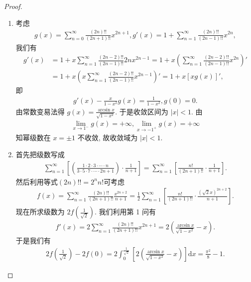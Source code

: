 \documentclass[../../main.tex]{subfiles}%
\begin{document}
\begin{proof}
\begin{enumerate}
\item 考虑
\begin{align*}
g(x) = \sum_{n=0}^{\infty} \frac{(2n)!!}{(2n + 1)!!} x^{2n + 1}, g'(x) = 1 + \sum_{n=1}^{\infty} \frac{(2n)!!}{(2n - 1)!!} x^{2n},
\end{align*}
我们有
\begin{align*}
g'(x) &= 1 + x \sum_{n=1}^{\infty} \frac{(2n - 2)!!}{(2n - 1)!!} 2n x^{2n - 1} = 1 + x \left( \sum_{n=1}^{\infty} \frac{(2n - 2)!!}{(2n - 1)!!} x^{2n} \right)' \\
&= 1 + x \left( x \sum_{n=1}^{\infty} \frac{(2n - 2)!!}{(2n - 1)!!} x^{2n - 1} \right)' = 1 + x [x g(x)]',
\end{align*}
即
\begin{align*}
g'(x) - \frac{x}{1 - x^2} g(x) = \frac{1}{1 - x^2}, g(0) = 0.
\end{align*}
由常数变易法得 $g(x) = \frac{\arcsin x}{\sqrt{1 - x^2}}$. 于是收敛区间为 $|x| < 1$. 由
\begin{align*}
\lim_{x \to 1^-} g(x) = +\infty, \lim_{x \to -1^+} g(x) = +\infty
\end{align*}
知幂级数在 $x = \pm 1$ 不收敛, 故收敛域为 $|x| < 1$.
\item 首先把级数写成
\begin{align*}
\sum_{n=1}^{\infty} \left[ \left( \frac{1 \cdot 2 \cdot 3 \cdot \cdots \cdot n}{3 \cdot 5 \cdot 7 \cdot \cdots \cdot 2n + 1} \right) \cdot \frac{1}{n + 1} \right] = \sum_{n=1}^{\infty} \left[ \frac{n!}{(2n + 1)!!} \cdot \frac{1}{n + 1} \right].
\end{align*}
然后利用等式$(2n)!!=2^nn!$可考虑
\begin{align*}
f(x) = \sum_{n=1}^{\infty} \frac{(2n)!!}{(2n + 1)!!} \frac{x^{2n + 2}}{n + 1} = \frac{1}{2} \sum_{n=1}^{\infty} \left[ \frac{n!}{(2n + 1)!!} \cdot \frac{(\sqrt{2}x)^{2n + 2}}{n + 1} \right].
\end{align*}
现在所求级数为 $2f\left( \frac{1}{\sqrt{2}} \right)$.
我们利用第 1 问有
\begin{align*}
f'(x) = 2 \sum_{n=1}^{\infty} \frac{(2n)!!}{(2n + 1)!!} x^{2n + 1} = 2 \left( \frac{\arcsin x}{\sqrt{1 - x^2}} - x \right).
\end{align*}
于是我们有
\begin{align*}
2f\left( \frac{1}{\sqrt{2}} \right) - 2f(0) = 2 \int_0^{\frac{1}{\sqrt{2}}} \left[ 2 \left( \frac{\arcsin x}{\sqrt{1 - x^2}} - x \right) \right] \mathrm{d}x = \frac{\pi^2}{8} - 1.
\end{align*}
\end{enumerate}
\end{proof}
\end{document}
